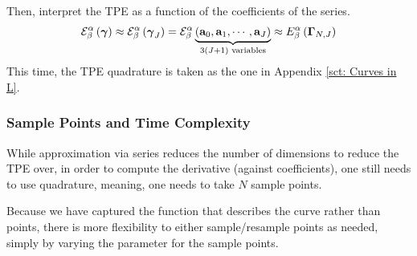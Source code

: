\documentclass[../dissertation.tex]{subfiles}
\begin{document}
Then, interpret the TPE as a function of the coefficients of the series.
\begin{equation}
    \mathcal{E}_{\beta}^{\alpha} \left( \boldsymbol{\gamma} \right)
    \approx
    \mathcal{E}_{\beta}^{\alpha} \left( \boldsymbol{\gamma}_{J} \right)
    =
    \mathcal{E}_{\beta}^{\alpha} \underbrace{\left( \mathbf{a}_{0}, \mathbf{a}_{1}, \cdots, \mathbf{a}_{J} \right)}_{3\left( J+1 \right) \text{ variables}}
    \approx
    E_{\beta}^{\alpha} \left( \boldsymbol{\Gamma}_{N,J} \right)
\end{equation}
This time, the TPE quadrature is taken as the one in Appendix \ref{sct: Curves in L}.

\subsubsection{Sample Points and Time Complexity}
While approximation via series reduces the number of dimensions to reduce the TPE over,
in order to compute the derivative (against coefficients),
one still needs to use quadrature, meaning, one needs to take $N$ sample points.

Because we have captured the function that describes the curve rather than points,
there is more flexibility to either sample/resample points as needed,
simply by varying the parameter for the sample points.
\end{document}
